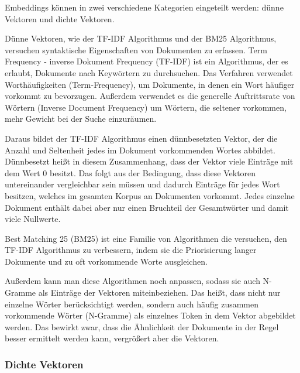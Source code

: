Embeddings können in zwei verschiedene Kategorien eingeteilt werden: dünne Vektoren und dichte Vektoren.

Dünne Vektoren, wie der TF-IDF Algorithmus und der BM25 Algorithmus, versuchen syntaktische Eigenschaften von Dokumenten zu erfassen.
Term Frequency - inverse Dokument Frequency (TF-IDF) ist ein Algorithmus, der es erlaubt, Dokumente nach Keywörtern zu durchsuchen.
Das Verfahren verwendet Worthäufigkeiten (Term-Frequency), um Dokumente, in denen ein Wort häufiger vorkommt zu bevorzugen.
Außerdem verwendet es die generelle Auftrittsrate von Wörtern (Inverse Document Frequency) um Wörtern, die seltener vorkommen, mehr Gewicht bei der Suche einzuräumen.

Daraus bildet der TF-IDF Algorithmus einen dünnbesetzten Vektor, der die Anzahl und Seltenheit jedes im Dokument vorkommenden Wortes abbildet. 
Dünnbesetzt heißt in diesem Zusammenhang, dass der Vektor viele Einträge mit dem Wert 0 besitzt. 
Das folgt aus der Bedingung, dass diese Vektoren untereinander vergleichbar sein müssen und dadurch Einträge für jedes Wort besitzen, welches im gesamten Korpus an Dokumenten vorkommt.
Jedes einzelne Dokument enthält dabei aber nur einen Bruchteil der Gesamtwörter und damit viele Nullwerte.

Best Matching 25 (BM25) ist eine Familie von Algorithmen die versuchen, den TF-IDF Algorithmus zu verbessern, indem sie die Priorisierung langer Dokumente und zu oft vorkommende Worte ausgleichen.

Außerdem kann man diese Algorithmen noch anpassen, sodass sie auch N-Gramme als Einträge der Vektoren miteinbeziehen. 
Das heißt, dass nicht nur einzelne Wörter berücksichtigt werden, sondern auch häufig zusammen vorkommende Wörter (N-Gramme) als einzelnes Token in dem Vektor abgebildet werden. 
Das bewirkt zwar, dass die Ähnlichkeit der Dokumente in der Regel besser ermittelt werden kann, vergrößert aber die Vektoren.

\subsubsection{Dichte Vektoren}

